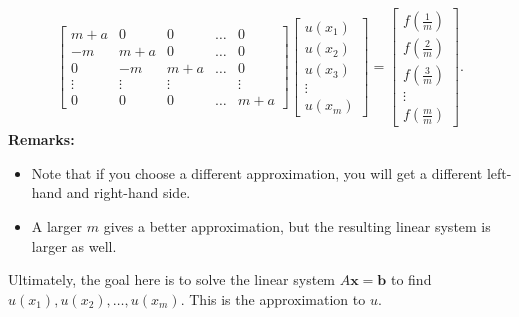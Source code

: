 \documentclass[letterpaper]{article}
\newcommand{\0}{\mathbf{0}}
\renewcommand{\b}{\mathbf{b}}
\newcommand{\x}{\mathbf{x}}
\begin{document}
\begin{equation*}
    \begin{aligned}
        \begin{bmatrix}
            m + a & 0 & 0 & \hdots & 0 \\ 
            -m & m + a & 0 & \hdots & 0 \\ 
            0 & -m & m + a & \hdots & 0 \\ 
            \vdots & \vdots & \vdots & & \vdots \\ 
            0 & 0 & 0 & \hdots & m + a
        \end{bmatrix} \begin{bmatrix}
            u(x_1) \\ u(x_2) \\ u(x_3) \\ \vdots \\ u(x_m)
        \end{bmatrix} = \begin{bmatrix}
            f\left(\frac{1}{m}\right) \\ 
            f\left(\frac{2}{m}\right) \\ 
            f\left(\frac{3}{m}\right) \\ 
            \vdots \\ 
            f\left(\frac{m}{m}\right)
        \end{bmatrix}.
    \end{aligned}
\end{equation*}
\textbf{Remarks:}
\begin{itemize}
    \item Note that if you choose a different approximation, you will get a different left-hand and right-hand side.
    \item A larger $m$ gives a better approximation, but the resulting linear system is larger as well. 
\end{itemize}
Ultimately, the goal here is to solve the linear system $A\x = \b$ to find $u(x_1), u(x_2), \hdots, u(x_m)$. This is the approximation to $u$.
\end{document}
